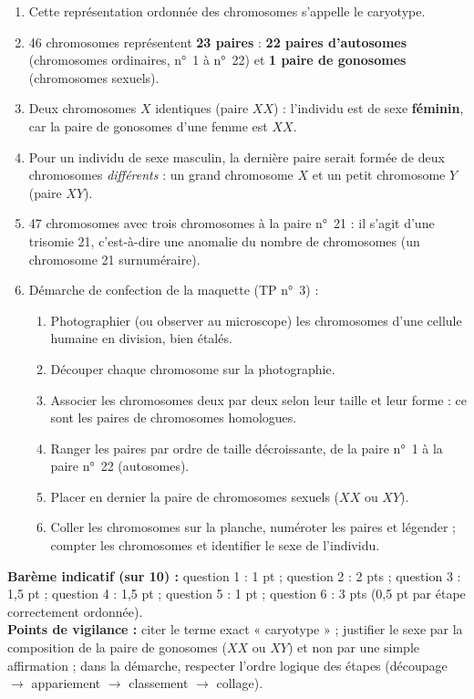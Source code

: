 \documentclass[11pt]{article}
\newcommand{\cle}[1]{{\popxbold\color{popdark}#1}}
\begin{document}
\begin{corrige}
\begin{enumerate}
\item Cette représentation ordonnée des chromosomes s'appelle le \cle{caryotype}.
\item 46 chromosomes représentent \textbf{23 paires} : \textbf{22 paires d'autosomes} (chromosomes ordinaires, n°~1 à n°~22) et \textbf{1 paire de gonosomes} (chromosomes sexuels).
\item Deux chromosomes $X$ identiques (paire $XX$) : l'individu est de sexe \textbf{féminin}, car la paire de gonosomes d'une femme est $XX$.
\item Pour un individu de sexe masculin, la dernière paire serait formée de deux chromosomes \emph{différents} : un grand chromosome $X$ et un petit chromosome $Y$ (paire $XY$).
\item 47 chromosomes avec trois chromosomes à la paire n°~21 : il s'agit d'une \cle{trisomie 21}, c'est-à-dire une anomalie du nombre de chromosomes (un chromosome 21 surnuméraire).
\item Démarche de confection de la maquette (TP n°~3) :
\begin{enumerate}
\item Photographier (ou observer au microscope) les chromosomes d'une cellule humaine en division, bien étalés.
\item Découper chaque chromosome sur la photographie.
\item Associer les chromosomes deux par deux selon leur taille et leur forme : ce sont les paires de chromosomes homologues.
\item Ranger les paires par ordre de taille décroissante, de la paire n°~1 à la paire n°~22 (autosomes).
\item Placer en dernier la paire de chromosomes sexuels ($XX$ ou $XY$).
\item Coller les chromosomes sur la planche, numéroter les paires et légender ; compter les chromosomes et identifier le sexe de l'individu.
\end{enumerate}
\end{enumerate}
\textbf{Barème indicatif (sur 10) :} question 1 : 1 pt ; question 2 : 2 pts ; question 3 : 1,5 pt ; question 4 : 1,5 pt ; question 5 : 1 pt ; question 6 : 3 pts (0,5 pt par étape correctement ordonnée).\\
\textbf{Points de vigilance :} citer le terme exact « caryotype » ; justifier le sexe par la composition de la paire de gonosomes ($XX$ ou $XY$) et non par une simple affirmation ; dans la démarche, respecter l'ordre logique des étapes (découpage $\rightarrow$ appariement $\rightarrow$ classement $\rightarrow$ collage).
\end{corrige}
\end{document}
